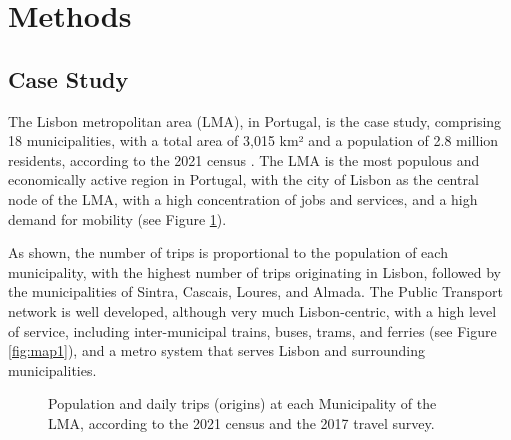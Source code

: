 \documentclass[review, doubleblind, 3p,
authoryear]{elsarticle} %
\providecommand{\DIFaddbeginFL}{} %
\providecommand{\DIFaddendFL}{} %
\providecommand{\DIFdelbeginFL}{} %
\providecommand{\DIFdelendFL}{} %
\newcommand{\DIFscaledelfig}{0.5}
\newlength{\DIFdelgraphicswidth} %
\newlength{\DIFdelgraphicsheight} %
\newcommand{\DIFaddincludegraphics}[2][]{{\color{blue}\fbox{\DIFOincludegraphics[#1]{#2}}}} %
\newcommand{\DIFdelincludegraphics}[2][]{%
\sbox{\DIFdelgraphicsbox}{\DIFOincludegraphics[#1]{#2}}%
\settoboxwidth{\DIFdelgraphicswidth}{\DIFdelgraphicsbox} %
\settoboxtotalheight{\DIFdelgraphicsheight}{\DIFdelgraphicsbox} %
\scalebox{\DIFscaledelfig}{%
\parbox[b]{\DIFdelgraphicswidth}{\usebox{\DIFdelgraphicsbox}\\[-\baselineskip] \rule{\DIFdelgraphicswidth}{0em}}\llap{\resizebox{\DIFdelgraphicswidth}{\DIFdelgraphicsheight}{%
\setlength{\unitlength}{\DIFdelgraphicswidth}%
\begin{picture}(1,1)%
\thicklines\linethickness{2pt} %
{\color[rgb]{1,0,0}\put(0,0){\framebox(1,1){}}}%
{\color[rgb]{1,0,0}\put(0,0){\line( 1,1){1}}}%
{\color[rgb]{1,0,0}\put(0,1){\line(1,-1){1}}}%
\end{picture}%
}\hspace*{3pt}}} %
} %
\DeclareRobustCommand{\DIFaddbeginFL}{\DIFOaddbeginFL \let\includegraphics\DIFaddincludegraphics} %
\DeclareRobustCommand{\DIFaddendFL}{\DIFOaddendFL \let\includegraphics\DIFOincludegraphics} %
\DeclareRobustCommand{\DIFdelbeginFL}{\DIFOdelbeginFL \let\includegraphics\DIFdelincludegraphics} %
\DeclareRobustCommand{\DIFdelendFL}{\DIFOaddendFL \let\includegraphics\DIFOincludegraphics} %
\begin{document}
\section{Methods}\label{methods}

\subsection{Case Study}\label{case-study}

The Lisbon metropolitan area (LMA), in Portugal, is the case study,
comprising 18 municipalities, with a total area of 3,015 km² and a
population of 2.8 million residents, according to the 2021 census
\citep{INEcensus}. The LMA is the most populous and economically active
region in Portugal, with the city of Lisbon as the central node of the
LMA, with a high concentration of jobs and services, and a high demand
for mobility (see Figure \ref{fig:lma}).

As shown, the number of trips is proportional to the population of each
municipality, with the highest number of trips originating in Lisbon,
followed by the municipalities of Sintra, Cascais, Loures, and Almada.
The Public Transport network is well developed, although very much
Lisbon-centric, with a high level of service, including inter-municipal
trains, buses, trams, and ferries (see Figure \ref{fig:map1}), and a
metro system that serves Lisbon and surrounding municipalities.

\begin{figure}
\DIFdelbeginFL %
\DIFdelendFL \DIFaddbeginFL {}\DIFaddendFL \caption{\label{lma}Population and daily trips (origins) at each Municipality of the LMA, according to the 2021 census and the 2017 travel survey.}\label{fig:lma}
\end{figure}
\end{document}

